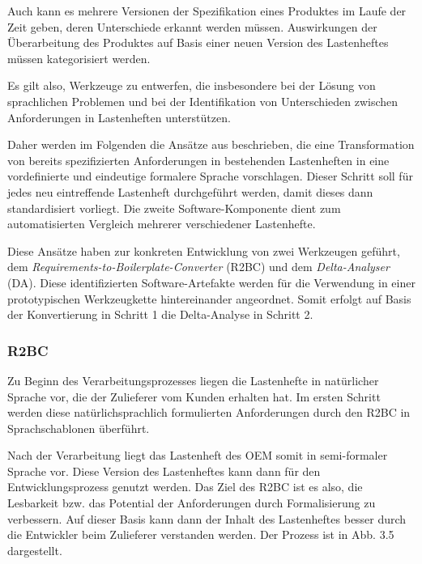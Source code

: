 \documentclass[12pt]{report}
\begin{document}
Auch kann es mehrere Versionen der Spezifikation eines Produktes im Laufe der Zeit geben, deren Unterschiede erkannt werden müssen. Auswirkungen der Überarbeitung des Produktes auf Basis einer neuen Version des Lastenheftes müssen kategorisiert werden. 

Es gilt also, Werkzeuge zu entwerfen, die insbesondere bei der Lösung von sprachlichen Problemen und bei der Identifikation von Unterschieden zwischen Anforderungen in Lastenheften unterstützen. 

Daher werden im Folgenden die Ansätze aus \cite{zh17} beschrieben, die eine Transformation von bereits spezifizierten Anforderungen in bestehenden Lastenheften in eine vordefinierte und eindeutige formalere Sprache vorschlagen. Dieser Schritt soll für jedes neu eintreffende Lastenheft durchgeführt werden, damit dieses dann standardisiert vorliegt. Die zweite Software-Komponente dient zum automatisierten Vergleich mehrerer verschiedener Lastenhefte. 

Diese Ansätze haben zur konkreten Entwicklung von zwei Werkzeugen geführt, dem \textit{Requirements-to-Boilerplate-Converter} (R2BC) und dem \textit{Delta-Analyser} (DA). Diese identifizierten Software-Artefakte werden für die Verwendung in einer prototypischen Werkzeugkette hintereinander angeordnet. Somit erfolgt auf Basis der Konvertierung in Schritt 1 die Delta-Analyse in Schritt 2.

\subsubsection{R2BC}
Zu Beginn des Verarbeitungsprozesses liegen die Lastenhefte in natürlicher Sprache vor, die der Zulieferer vom Kunden erhalten hat. Im ersten Schritt werden diese natürlichsprachlich formulierten Anforderungen durch den R2BC in Sprachschablonen überführt. 

Nach der Verarbeitung liegt das Lastenheft des OEM somit in semi-formaler Sprache vor. Diese Version des Lastenheftes kann dann für den Entwicklungsprozess genutzt werden. Das Ziel des R2BC ist es also, die Lesbarkeit bzw. das Potential der Anforderungen durch Formalisierung zu verbessern. Auf dieser Basis kann dann der Inhalt des Lastenheftes besser durch die Entwickler beim Zulieferer verstanden werden. Der Prozess ist in Abb. 3.5 dargestellt.
\end{document}
